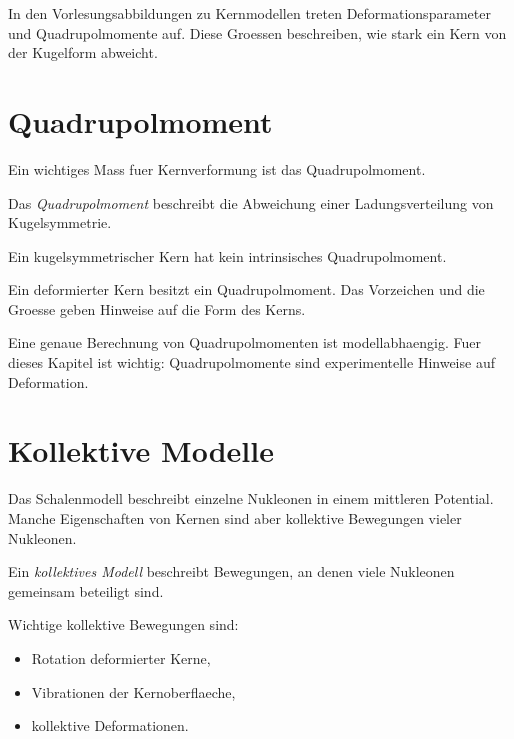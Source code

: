 \begin{notebox}
In den Vorlesungsabbildungen zu Kernmodellen treten Deformationsparameter und
Quadrupolmomente auf.
Diese Groessen beschreiben, wie stark ein Kern von der Kugelform abweicht.
\end{notebox}

\section{Quadrupolmoment}

Ein wichtiges Mass fuer Kernverformung ist das Quadrupolmoment.

\begin{definitionbox}
Das \emph{Quadrupolmoment} beschreibt die Abweichung einer Ladungsverteilung von
Kugelsymmetrie.
\end{definitionbox}

\begin{conceptbox}
Ein kugelsymmetrischer Kern hat kein intrinsisches Quadrupolmoment.

Ein deformierter Kern besitzt ein Quadrupolmoment.
Das Vorzeichen und die Groesse geben Hinweise auf die Form des Kerns.
\end{conceptbox}

\begin{notebox}
Eine genaue Berechnung von Quadrupolmomenten ist modellabhaengig.
Fuer dieses Kapitel ist wichtig:
Quadrupolmomente sind experimentelle Hinweise auf Deformation.
\end{notebox}

\section{Kollektive Modelle}

Das Schalenmodell beschreibt einzelne Nukleonen in einem mittleren Potential.
Manche Eigenschaften von Kernen sind aber kollektive Bewegungen vieler Nukleonen.

\begin{definitionbox}
Ein \emph{kollektives Modell} beschreibt Bewegungen, an denen viele Nukleonen
gemeinsam beteiligt sind.
\end{definitionbox}

\begin{conceptbox}
Wichtige kollektive Bewegungen sind:
\begin{itemize}
    \item Rotation deformierter Kerne,
    \item Vibrationen der Kernoberflaeche,
    \item kollektive Deformationen.
\end{itemize}
\end{conceptbox}

